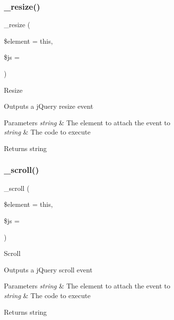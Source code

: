 \subsubsection{\texorpdfstring{\+\_\+resize()}{\_resize()}}
{\footnotesize\ttfamily \+\_\+resize (\begin{DoxyParamCaption}\item[{}]{\$element = {\ttfamily \textquotesingle{}this\textquotesingle{}},  }\item[{}]{\$js = {\ttfamily \textquotesingle{}\textquotesingle{}} }\end{DoxyParamCaption})\hspace{0.3cm}{\ttfamily [protected]}}

Resize

Outputs a j\+Query resize event


\begin{DoxyParams}{Parameters}
{\em string} & The element to attach the event to \\
\hline
{\em string} & The code to execute \\
\hline
\end{DoxyParams}
\begin{DoxyReturn}{Returns}
string 
\end{DoxyReturn}
\mbox{\label{class_c_i___jquery_a8242a35dd382dd24e4bb7eaba2be2982}} 
\subsubsection{\texorpdfstring{\+\_\+scroll()}{\_scroll()}}
{\footnotesize\ttfamily \+\_\+scroll (\begin{DoxyParamCaption}\item[{}]{\$element = {\ttfamily \textquotesingle{}this\textquotesingle{}},  }\item[{}]{\$js = {\ttfamily \textquotesingle{}\textquotesingle{}} }\end{DoxyParamCaption})\hspace{0.3cm}{\ttfamily [protected]}}

Scroll

Outputs a j\+Query scroll event


\begin{DoxyParams}{Parameters}
{\em string} & The element to attach the event to \\
\hline
{\em string} & The code to execute \\
\hline
\end{DoxyParams}
\begin{DoxyReturn}{Returns}
string 
\end{DoxyReturn}
\mbox{\label{class_c_i___jquery_afc1e291a9264809af8cbb0bb4a30dcb2}} 

